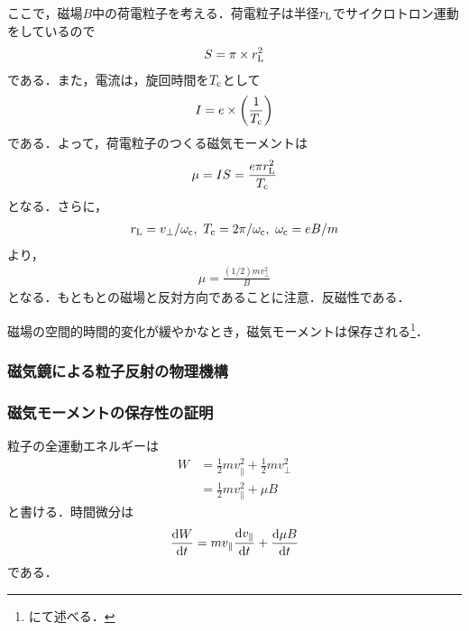 \documentclass{report}
\begin{document}
        ここで，磁場$B$中の荷電粒子を考える．荷電粒子は半径$r_{\mathrm{L}}$でサイクロトロン運動をしているので
        \begin{align}
          S = \pi \times r_{\mathrm{L}}^2
        \end{align}
        である．また，電流は，旋回時間を$T_{\mathrm{c}}$として
        \begin{align}
          I = e \times \qty(\frac{1}{T_{\mathrm{c}}})
        \end{align}
        である．よって，荷電粒子のつくる磁気モーメントは
        \begin{align}
          \mu = IS = \frac{e\pi r_{\mathrm{L}}^2}{T_{\mathrm{c}}}
        \end{align}
        となる．さらに，
        \begin{align}
          r_{\mathrm{L}} = v_{\perp} / \omega_{\mathrm{c}},\ T_{\mathrm{c}} = 2\pi / \omega_{\mathrm{c}},\ \omega_{\mathrm{c}} = eB/m
        \end{align}
        より，
        \begin{align}
          \mu = \frac{(1/2)mv_{\perp}^2}{B}
        \end{align}
        となる．もともとの磁場と反対方向であることに注意．反磁性である．

        磁場の空間的時間的変化が緩やかなとき，磁気モーメントは保存される\footnote{にて述べる．}．



      \subsubsection{磁気鏡による粒子反射の物理機構}

      \subsubsection{磁気モーメントの保存性の証明}
      \label{sec:conservation-of-magnetic-moment}
        粒子の全運動エネルギーは
        \begin{align}
          W &= \frac{1}{2}mv_{\parallel}^2 + \frac{1}{2}mv_{\perp}^2\\
          &= \frac{1}{2}mv_{\parallel}^2 + \mu B
        \end{align}
        と書ける．時間微分は
        \begin{align}
          \dv{W}{t} = mv_{\parallel}\dv{v_{\parallel}}{t} + \dv{\mu B}{t}
        \end{align}
        である．
\end{document}
